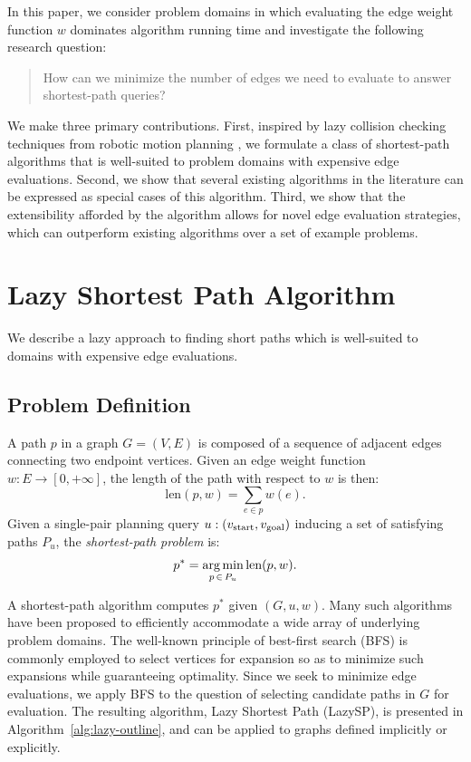In this paper,
we consider problem domains in which evaluating the edge weight
function $w$ dominates algorithm running time
and investigate the following research question:
\begin{quote}
How can we minimize the number of edges we need to evaluate
to answer shortest-path queries?
\end{quote}

We make three primary contributions.
First,
inspired by lazy collision checking techniques from 
robotic motion planning \citep{bohlin2000lazyprm},
we formulate a class of shortest-path algorithms 
that is well-suited to problem domains with expensive edge evaluations.
Second,
we show that several existing algorithms in the literature
can be expressed as special cases of this algorithm.
Third,
we show that the extensibility afforded by the algorithm allows for
novel edge evaluation strategies,
which can outperform existing algorithms
over a set of example problems.

\section{Lazy Shortest Path Algorithm}

We describe a lazy approach to finding short paths
which is well-suited to domains with
expensive edge evaluations.

\subsection{Problem Definition}

A path $p$ in a graph $G = (V,E)$
is composed of a sequence of adjacent edges 
connecting two endpoint vertices.
Given an edge weight function
$w : E \rightarrow [0,+\infty]$,
the length of the path with respect to $w$ is then:
\begin{equation}
   \mbox{len}(p, w) = \sum_{e \in p} w(e).
\end{equation}
Given a single-pair planning query
$u: (v_{\mbox{\scriptsize start}}, v_{\mbox{\scriptsize goal}})$
inducing a set of satisfying paths $P_u$,
the \emph{shortest-path problem} is:
\begin{equation}
   p^* = \operatorname*{arg\,min}_{p \, \in \, P_u} \mbox{len}(p, w).
   \label{eqn:objective}
\end{equation}

A shortest-path algorithm computes $p^*$
given $(G, u, w)$.
Many such algorithms have been proposed
to efficiently accommodate a wide array of underlying problem domains.
The well-known principle of best-first search (BFS)
is commonly employed to select vertices for expansion
so as to minimize such expansions while guaranteeing optimality.
Since we seek to minimize edge evaluations,
we apply BFS to the question of selecting candidate paths in
$G$ for evaluation.
The resulting algorithm, Lazy Shortest Path (LazySP),
is presented in Algorithm~\ref{alg:lazy-outline},
and can be applied to graphs defined implicitly or explicitly.

